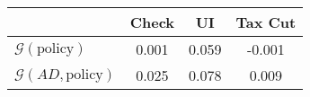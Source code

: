 \begin{tabular}{@{}lccc@{}} 
\toprule 
                          & Check      & UI    & Tax Cut    \\  \midrule 
$\mathcal{G}(\text{policy})$ & 0.001  & 0.059  & -0.001     \\ 
$\mathcal{G}(AD,\text{policy})$ & 0.025  & 0.078  & 0.009     \\ 
\end{tabular}  
